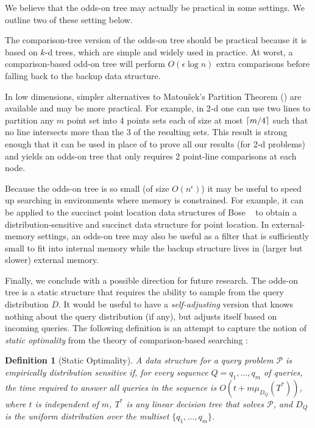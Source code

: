 \documentclass{patmorin}
\newtheorem{defn}{Definition}
\begin{document}
We believe that the odds-on tree may actually be practical in some settings.
We outline two of these setting below.

The comparison-tree version of the odds-on tree should be practical
because it is based on $k$-d trees, which are simple and widely used
in practice. At worst, a comparison-based odd-on tree will perform
$O(\epsilon\log n)$ extra comparisons before falling back to the backup
data structure.

In low dimensions, simpler alternatives to Matou\v{s}ek's Partition
Theorem () are available and may be more
practical.  For example, in 2-d one can use two lines to partition any $m$
point set into 4 points sets each of size at most ${\left\lceil m/4 \right\rceil}$ such that
no line intersects more than the 3 of the resulting sets. This result is
strong enough that it can be used in place of 
to prove all our results (for 2-d problems) and yields an odds-on tree
that only requires 2 point-line comparisons at each node.

Because the odds-on tree is so small (of size $O(n^\epsilon)$) it
may be useful to speed up searching in environments where memory is
constrained. For example, it can be applied to the succinct point
location data structures of Bose \etal\ \cite{bchmm09} to obtain a
distribution-sensitive and succinct data structure for point location.
In external-memory settings, an odds-on tree may also be useful as a filter
that is sufficiently small to fit into internal memory while the backup
structure lives in (larger but slower) external memory.

Finally, we conclude with a possible direction for future research.  The
odds-on tree is a static structure that requires the ability to sample from
the query distribution $D$.  It would be useful to have a \emph{self-adjusting}
version that knows nothing about the query distribution (if any), but
adjusts itself based on incoming queries.   The following definition
is an attempt to capture the notion of \emph{static optimality} from the theory
of comparison-based searching \cite{st85}:

\begin{defn}[Static Optimality]\label{defn:static-optimality}
A data structure for a query problem $\mathcal{P}$ is \emph{empirically
distribution sensitive} if, for every sequence $Q=q_1,\ldots,q_m$
of queries, the time required to answer all queries in the sequence
is $O(t + m\mu_{D_Q}(T^*))$, where $t$ is independent of $m$, $T^*$
is any linear decision tree that solves $\mathcal{P}$, and $D_{Q}$
is the uniform distribution over the multiset $\{q_1,\ldots,q_m\}$.
\end{defn}
\end{document}
